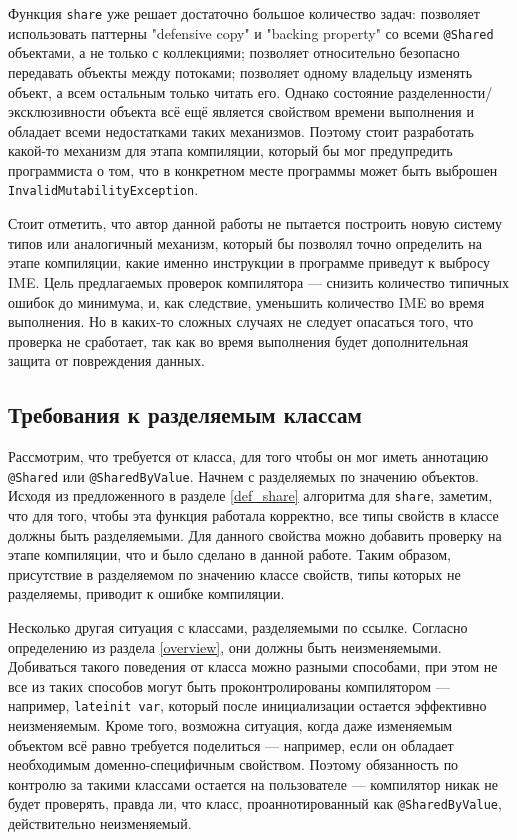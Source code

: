 \documentclass[specification,annotation,times]{itmo-student-thesis}
\begin{document}
Функция \texttt{share} уже решает достаточно большое количество задач: позволяет использовать паттерны "defensive copy" и "backing property" со всеми \texttt{@Shared} объектами, а не только с коллекциями; позволяет относительно безопасно передавать объекты между потоками; позволяет одному владельцу изменять объект, а всем остальным только читать его.
Однако состояние разделенности/эксклюзивности объекта всё ещё является свойством времени выполнения и обладает всеми недостатками таких механизмов. 
Поэтому стоит разработать какой-то механизм для этапа компиляции, который бы мог предупредить программиста о том, что в конкретном месте программы может быть выброшен \texttt{InvalidMutabilityException}.

Стоит отметить, что автор данной работы не пытается построить новую систему типов или аналогичный механизм, который бы позволял точно определить на этапе компиляции, какие именно инструкции в программе приведут к выбросу IME.
Цель предлагаемых проверок компилятора --- снизить количество типичных ошибок до минимума, и, как следствие, уменьшить количество IME во время выполнения.
Но в каких-то сложных случаях не следует опасаться того, что проверка не сработает,
так как во время выполнения будет дополнительная защита от повреждения данных.

\subsection{Требования к разделяемым классам}\label{shared_requirements}

Рассмотрим, что требуется от класса, для того чтобы он мог иметь аннотацию \texttt{@Shared} или \texttt{@SharedByValue}.
Начнем с разделяемых по значению объектов.
Исходя из предложенного в разделе \ref{def_share} алгоритма для
\texttt{share}, заметим, что для того, чтобы эта функция работала корректно,
все типы свойств в классе должны быть разделяемыми.
Для данного свойства можно добавить проверку на этапе компиляции, что и было сделано в данной работе.
Таким образом, присутствие в разделяемом  по значению классе свойств, типы которых не разделяемы, приводит к ошибке компиляции.

Несколько другая ситуация с классами, разделяемыми по ссылке. Согласно определению из раздела \ref{overview}, они должны быть неизменяемыми.
Добиваться такого поведения от класса можно разными способами, при этом не все из таких способов могут быть проконтролированы компилятором --- например, \texttt{lateinit var}, который после инициализации остается эффективно неизменяемым.
Кроме того, возможна ситуация, когда даже изменяемым объектом всё равно требуется поделиться --- например, если он обладает необходимым доменно-специфичным свойством.
Поэтому обязанность по контролю за такими классами остается на пользователе --- компилятор никак не будет проверять, правда ли, что класс, проаннотированный как \texttt{@SharedByValue}, действительно неизменяемый.
\end{document}

